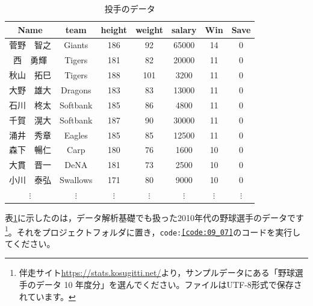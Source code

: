 \documentclass{ltjsbook}
\begin{document}
\begin{table}[ht]
	\caption{投手のデータ}
	\centering
	\begin{tabular}[t]{ccccccc}
		\hline
		Name     & team     & height   & weight   & salary   & Win      & Save     \\
		\hline
		菅野　智之    & Giants   & 186      & 92       & 65000    & 14       & 0        \\
		西　勇輝     & Tigers   & 181      & 82       & 20000    & 11       & 0        \\
		秋山　拓巳    & Tigers   & 188      & 101      & 3200     & 11       & 0        \\
		大野　雄大    & Dragons  & 183      & 83       & 13000    & 11       & 0        \\
		石川　柊太    & Softbank & 185      & 86       & 4800     & 11       & 0        \\
		千賀　滉大    & Softbank & 187      & 90       & 30000    & 11       & 0        \\
		涌井　秀章    & Eagles   & 185      & 85       & 12500    & 11       & 0        \\
		森下　暢仁    & Carp     & 180      & 76       & 1600     & 10       & 0        \\
		大貫　晋一    & DeNA     & 181      & 73       & 2500     & 10       & 0        \\
		小川　泰弘    & Swallows & 171      & 80       & 9000     & 10       & 0        \\
		$\vdots$ & $\vdots$ & $\vdots$ & $\vdots$ & $\vdots$ & $\vdots$ & $\vdots$ \\
		\hline
	\end{tabular}
	\label{tbl:09_01}
\end{table}

表\ref{tbl:09_01}に示したのは，データ解析基礎でも扱った2010年代の野球選手のデータです\footnote{伴走サイト\url{https://stats.kosugitti.net/}より，サンプルデータにある「野球選手のデータ 10 年度分」を選んでください。ファイルはUTF-8形式で保存されています。}。それをプロジェクトフォルダに置き，\texttt{code:\ref{code:09_07}}のコードを実行してください。
\end{document}

